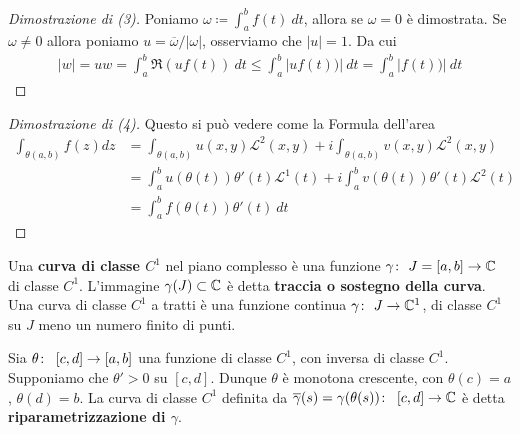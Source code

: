 \begin{proof}[Dimostrazione di (3)]
	Poniamo $\omega \coloneqq \int_{a}^{b} f(t)\ dt$, allora se $\omega = 0$ è dimostrata. Se $\omega \neq 0$ allora poniamo $u = \overline{\omega}/|\omega|$, osserviamo che $|u|=1$. Da cui
	\begin{equation*}
	\begin{aligned}
	|w| = uw = \int_{a}^b \Re(uf(t))\ dt \le \int_{a}^b |uf(t))|\ dt = \int_{a}^b |f(t))|\ dt  
	\end{aligned}
	\end{equation*}
\end{proof}

\begin{proof}[Dimostrazione di (4)]
	Questo si può vedere come la Formula dell'area  
	\begin{equation*}
	\begin{aligned}
	\int_{\theta(a,b)} f(z) dz & = \int_{\theta(a,b)} u(x,y) \mathcal{L}^2(x,y)
	+ i\int_{\theta(a,b)} v(x,y) \mathcal{L}^2(x,y)\\
	& = \int_a^b u(\theta(t))\theta'(t) \mathcal{L}^1(t) 
	+ i\int^b_a v(\theta(t))\theta'(t) \mathcal{L}^2(t)\\
	& = \int_a^b f(\theta(t)) \theta'(t)\ dt		
	\end{aligned}
	\end{equation*}
\end{proof}

\begin{definition}
	\label{defn:curva-c1}
	Una \textbf{curva di classe $C^1$} nel piano complesso è una funzione $\gamma \colon\ J=\left[a,b\right] \rightarrow \mathbb{C}$ di classe $C^1$. L'immagine $\gamma(J) \subset \mathbb{C}$ è detta \textbf{traccia o sostegno della curva}. Una curva di classe $C^1$ a tratti è una funzione continua $\gamma \colon\ J \rightarrow \mathbb{C}^1$, di classe $C^1$ su $J$ meno un numero finito di punti. 		
\end{definition}

\begin{definition}
	\label{defn:riparametrizzazione-curva-classe-c1}
	Sia $\theta \colon\ \left[c,d\right] \rightarrow \left[a,b\right]$ una funzione di classe $C^1$, con inversa di classe $C^1$. Supponiamo che $\theta' > 0$ su $\left[c, d\right]$. Dunque $\theta$ è monotona crescente, con $\theta(c) = a$, $\theta(d) = b$. La curva di classe $C^1$ definita da $\overline{\gamma}(s) = \gamma(\theta (s)) \colon\ \left[c,d\right] \rightarrow \mathbb{C}$ è detta \textbf{riparametrizzazione di $\gamma$}.
\end{definition}


